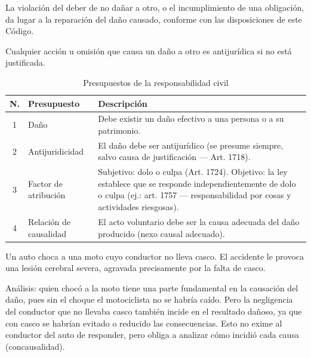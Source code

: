 \documentclass[12pt,oneside]{book}
\begin{document}
\begin{definicion}
La violación del deber de no dañar a otro, o el incumplimiento de una obligación, da lugar a la reparación del daño causado, conforme con las disposiciones de este Código.
\end{definicion}

\begin{definicion}
Cualquier acción u omisión que causa un daño a otro es antijurídica si no está justificada.
\end{definicion}

\begin{table}[H]
\centering
\caption{Presupuestos de la responsabilidad civil}
\begin{tabularx}{\textwidth}{c l X}
\toprule
\textbf{N.\textdegree{}} & \textbf{Presupuesto} & \textbf{Descripción} \\
\midrule
1 & Daño & Debe existir un daño efectivo a una persona o a su patrimonio. \\
2 & Antijuridicidad & El daño debe ser antijurídico (se presume siempre, salvo causa de justificación --- Art. 1718). \\
3 & Factor de atribución & Subjetivo: dolo o culpa (Art. 1724). Objetivo: la ley establece que se responde independientemente de dolo o culpa (ej.: art. 1757 --- responsabilidad por cosas y actividades riesgosas). \\
4 & Relación de causalidad & El acto voluntario debe ser la causa adecuada del daño producido (nexo causal adecuado). \\
\bottomrule
\end{tabularx}
\end{table}

\begin{ejemplo}
Un auto choca a una moto cuyo conductor no lleva casco. El accidente le provoca una lesión cerebral severa, agravada precisamente por la falta de casco.

Análisis: quien chocó a la moto tiene una parte fundamental en la causación del daño, pues sin el choque el motociclista no se habría caído. Pero la negligencia del conductor que no llevaba casco también incide en el resultado dañoso, ya que con casco se habrían evitado o reducido las consecuencias. Esto no exime al conductor del auto de responder, pero obliga a analizar cómo incidió cada causa (concausalidad).
\end{ejemplo}
\end{document}
